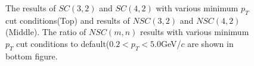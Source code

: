 \begin{figure}[p]
\begin{center}
        \caption{The results of $SC(3,2)$ and $SC(4,2)$ with various minimum $p_T$ cut conditions(Top) and results of  $NSC(3,2)$ and $NSC(4,2)$(Middle). The ratio of $NSC(m,n)$ results with various minimum $p_T$ cut conditions to default($0.2 < p_T < 5.0$GeV/$c$ are shown in bottom figure.}
        \label{fig:ptdep}
        \end{center}   
     \end{figure}


	\begin{figure}[p]
		\begin{center}

\end{center}
\end{figure}
